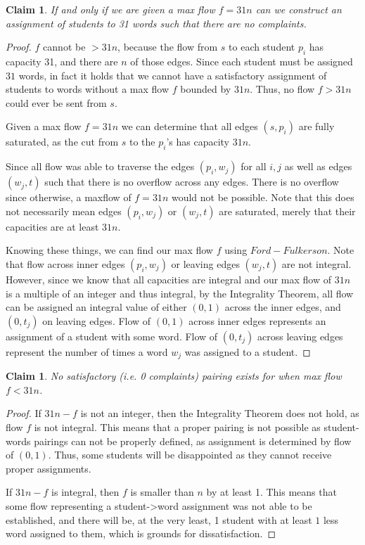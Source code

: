 \documentclass[11pt]{article}
\newtheorem{claim}[theorem]{Claim}
\begin{document}
\begin{claim}
If and only if we are given a max flow $f=31n$ can we construct an assignment of students to 31 words such that there are no complaints. 
\end{claim}

\begin{proof}
$f$ cannot be $> 31n$, because the flow from $s$ to each student $p_i$ has capacity 31, and there are $n$ of those edges. Since each student must be assigned $31$ words, in fact it holds that we cannot have a satisfactory assignment of students to words without a max flow $f$ bounded by $31n$. Thus, no flow $f > 31n$ could ever be sent from $s$.

Given a max flow $f = 31n$ we can determine that all edges $(s, p_i)$ are fully saturated, as the cut from $s$ to the $p_i$'s has capacity $31n$. 

Since all flow was able to traverse the edges $(p_i, w_j)$ for all $i, j$ as well as edges $(w_j, t)$ such that there is no overflow across any edges. There is no overflow since otherwise, a maxflow of $f = 31n$ would not be possible. Note that this does not necessarily mean edges $(p_i, w_j)$ or $(w_j, t)$ are saturated, merely that their capacities are at least $31n$.

Knowing these things, we can find our max flow $f$ using $Ford-Fulkerson$. Note that flow across inner edges $(p_i, w_j)$ or leaving edges $(w_j, t)$ are not integral. However, since we know that all capacities are integral and our max flow of $31n$ is a multiple of an integer and thus integral, by the Integrality Theorem, all flow can be assigned an integral value of either $(0,1)$ across the inner edges, and $(0, t_j)$  on leaving edges. Flow of $(0, 1)$ across inner edges represents an assignment of a student with some word. Flow of $(0, t_j)$ across leaving edges represent the number of times a word $w_j$ was assigned to a student. 
\end{proof}

\begin{claim}
No satisfactory (i.e. 0 complaints) pairing exists for when max flow $f < 31n$.
\end{claim}
\begin{proof}
If $31n-f$ is not an integer, then the Integrality Theorem does not hold, as flow $f$ is not integral. This means that a proper pairing is not possible as student-words pairings can not be properly defined, as assignment is determined by flow of $(0,1)$. Thus, some students will be disappointed as they cannot receive proper assignments.

If $31n-f$ is integral, then $f$ is smaller than $n$ by at least 1. This means that some flow representing a student->word assignment was not able to be established, and there will be, at the very least, 1 student with at least $1$ less word assigned to them, which is grounds for dissatisfaction.
\end{proof}
\end{document}
